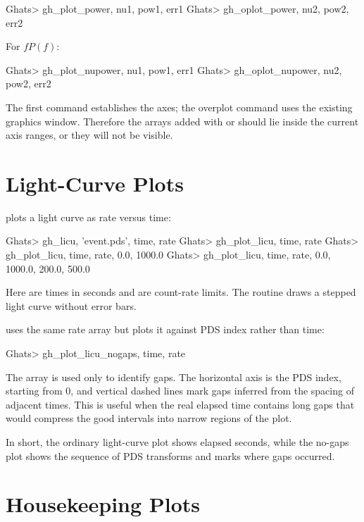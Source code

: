\begin{ghatsconsole}
Ghats> gh_plot_power, nu1, pow1, err1
Ghats> gh_oplot_power, nu2, pow2, err2
\end{ghatsconsole}

For \(fP(f)\):

\begin{ghatsconsole}
Ghats> gh_plot_nupower, nu1, pow1, err1
Ghats> gh_oplot_nupower, nu2, pow2, err2
\end{ghatsconsole}

The first command establishes the axes; the overplot command uses the existing
graphics window.  Therefore the arrays added with 
or  should lie inside the current axis ranges, or
they will not be visible.

\section{Light-Curve Plots}

 plots a light curve as rate versus time:

\begin{ghatsconsole}
Ghats> gh_licu, 'event.pds', time, rate
Ghats> gh_plot_licu, time, rate
Ghats> gh_plot_licu, time, rate, 0.0, 1000.0
Ghats> gh_plot_licu, time, rate, 0.0, 1000.0, 200.0, 500.0
\end{ghatsconsole}

Here  are times in seconds and  are count-rate
limits.  The routine draws a stepped light curve without error bars.

 uses the same rate array but plots it against
PDS index rather than time:

\begin{ghatsconsole}
Ghats> gh_plot_licu_nogaps, time, rate
\end{ghatsconsole}

The  array is used only to identify gaps.  The horizontal axis is
the PDS index, starting from 0, and vertical dashed lines mark gaps inferred
from the spacing of adjacent times.  This is useful when the real elapsed time
contains long gaps that would compress the good intervals into narrow regions
of the plot.

In short, the ordinary light-curve plot shows elapsed seconds, while the
no-gaps plot shows the sequence of PDS transforms and marks where gaps
occurred.

\section{Housekeeping Plots}

